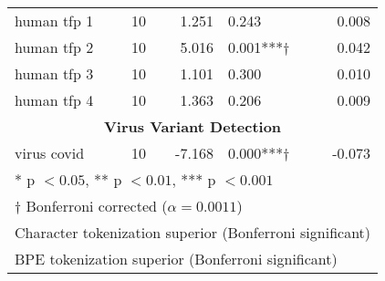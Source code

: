 \begin{table}[]
\begin{center}
\begin{tabular}{@{}lcrlr@{}}
human tfp 1 & 10 & 1.251 & 0.243 & 0.008 \\
\rowcolor{teal!25}human tfp 2 & 10 & 5.016 & 0.001***† & 0.042 \\
human tfp 3 & 10 & 1.101 & 0.300 & 0.010 \\
human tfp 4 & 10 & 1.363 & 0.206 & 0.009 \\
\midrule
\multicolumn{5}{c}{\textbf{Virus Variant Detection}} \\
\midrule
\rowcolor{magenta!25}virus covid & 10 & -7.168 & 0.000***† & -0.073 \\
\bottomrule
\multicolumn{5}{l}{* p $< 0.05$, ** p $< 0.01$, *** p $< 0.001$} \\
\multicolumn{5}{l}{† Bonferroni corrected ($\alpha = 0.0011$)} \\
\multicolumn{5}{l}{\cellcolor{teal!25} Character tokenization superior (Bonferroni significant)} \\
\multicolumn{5}{l}{\cellcolor{magenta!25} BPE tokenization superior (Bonferroni significant)}
\end{tabular}
\end{center}
\end{table}